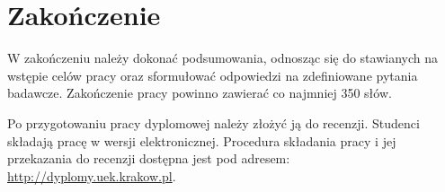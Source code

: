 \chapter*{Zakończenie}
\label{chap:zakonczenie}
\addtocounter{chapter}{0}

W zakończeniu należy dokonać podsumowania, odnosząc się do stawianych na wstępie celów pracy oraz sformułować odpowiedzi na zdefiniowane pytania badawcze. Zakończenie pracy powinno zawierać co najmniej 350 słów.

Po przygotowaniu pracy dyplomowej należy złożyć ją do recenzji. Studenci składają pracę w wersji elektronicznej. Procedura składania pracy i jej przekazania do recenzji dostępna jest pod adresem: \url{http://dyplomy.uek.krakow.pl}. 
